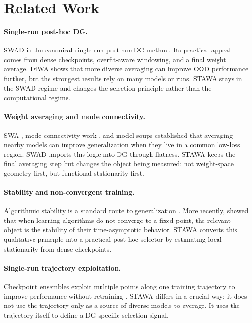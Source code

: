\documentclass{article}
\newcommand{\ood}{OOD}
\newcommand{\stawa}{\textup{\textsc{STAWA}}}
\newcommand{\swad}{\textup{\textsc{SWAD}}}
\begin{document}
\section{Related Work}

\paragraph{Single-run post-hoc DG.}
\swad{} \citep{cha2021wad} is the canonical single-run post-hoc DG method. Its practical appeal comes from dense checkpoints, overfit-aware windowing, and a final weight average. DiWA \citep{rame2022diwa} shows that more diverse averaging can improve \ood{} performance further, but the strongest results rely on many models or runs. \stawa{} stays in the \swad{} regime and changes the selection principle rather than the computational regime.

\paragraph{Weight averaging and mode connectivity.}
SWA \citep{izmailov2018swa}, mode-connectivity work \citep{garipov2018fge,frankle2020linear}, and model soups \citep{wortsman2022soups} established that averaging nearby models can improve generalization when they live in a common low-loss region. \swad{} imports this logic into DG through flatness. \stawa{} keeps the final averaging step but changes the object being measured: not weight-space geometry first, but functional stationarity first.

\paragraph{Stability and non-convergent training.}
Algorithmic stability is a standard route to generalization \citep{bousquet2002stability,hardt2016train}. More recently, \citet{chandramoorthy2022nonconvergent} showed that when learning algorithms do not converge to a fixed point, the relevant object is the stability of their time-asymptotic behavior. \stawa{} converts this qualitative principle into a practical post-hoc selector by estimating local stationarity from dense checkpoints.

\paragraph{Single-run trajectory exploitation.}
Checkpoint ensembles exploit multiple points along one training trajectory to improve performance without retraining \citep{chen2017checkpoint}. \stawa{} differs in a crucial way: it does not use the trajectory only as a source of diverse models to average. It uses the trajectory itself to define a DG-specific selection signal.
\end{document}
